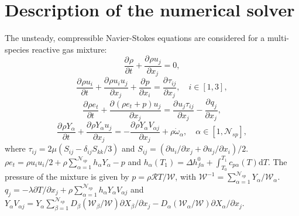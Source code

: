 \documentclass[conf]{new-aiaa}
\newcommand*{\pd}[3][]{\frac{\partial^{#1}#2}{\partial{#3}^{#1}}} %
\newcommand{\addim}[1]{{#1}} %
\newcommand{\Wcal}{\mathcal{W}}
\newcommand{\Rcal}{\mathcal{R}}
\newcommand{\nspc}{\mathcal{N}_{sp}}
\begin{document}
\section{Description of the numerical solver}
The unsteady, compressible Navier-Stokes equations are considered for a multi-species reactive gas mixture:
\begin{equation}\label{eq:eqs_originelles_ch_i}
\pd{\addim{\rho}}{\addim{t}}+
\pd{\addim{\rho} \addim{u}_j}{\addim{x}_j}=0 ,
\end{equation}
\begin{equation}
\pd{\addim{\rho} \addim{u}_i}{\addim{t}}+
\pd{\addim{\rho} \addim{u}_i \addim{u}_j}{\addim{x}_j}
+\pd{\addim{p}}{\addim{x}_i}=\pd{\addim{\tau}_{ij}}{\addim{x}_j} , \quad
i \in \left[ 1,3 \right] ,
\end{equation}
\begin{equation}
\pd{\addim{\rho} \addim{e}_t}{\addim{t}}+
\pd{\left(\addim{\rho} \addim{e}_t + \addim{p} \right)\addim{u}_j}
{\addim{x}_j}=
\pd{\addim{u}_j\addim{\tau}_{ij}}{\addim{x}_j}
-\pd{\addim{q}_j}{\addim{x}_j} , \label{eq:energie_ch}
\end{equation}
\begin{equation}
\pd{\addim{\rho}Y_\alpha}{\addim{t}}+
\pd{\addim{\rho} Y_\alpha \addim{u}_j}{\addim{x}_j}=
-\pd{\addim{\rho} Y_\alpha \addim{V}_{\alpha j}}{\addim{x}_j} +
\addim{\rho} \addim{\dot{\omega}}_\alpha , \quad
\alpha \in \left[ 1,\nspc \right] ,
\label{eq:eqs_originelles_ch_f}
\end{equation}
where $\addim{\tau}_{ij}=2\addim{\mu}\left(\addim{S}_{ij} - \delta_{ij} \addim{S}_{kk} / 3 \right)$ and $\addim{S}_{ij}=\left(\partial{\addim{u}_i}/\partial{\addim{x}_j}+
\partial{\addim{u}_j}/\partial{\addim{x}_i}\right)/2$. $\addim{\rho}\addim{e}_t=\addim{\rho}{\addim{u}_i\addim{u}_i}/{2}+ \addim{\rho}\sum^{\nspc}_{\alpha=1} \addim{h}_\alpha Y_\alpha - \addim{p}$ and $\addim{h}_\alpha \left(\addim{T}_1\right) =  \Delta {\addim{h}}^0_{f\alpha} + \int^{\addim{T}_1}_{\addim{T}_0}  \addim{c}_{p\alpha} \left(\addim{T}\right) \mathrm{d} \addim{T}$. The pressure of the mixture is given by $\addim{p}=\addim{\rho}{\Rcal}\addim{T}/{\Wcal}$, with $\Wcal^{-1}=\sum^{\nspc}_{\alpha=1} {Y_\alpha}/{\Wcal_\alpha}$. $\addim{q}_j=-\addim{\lambda} \partial{\addim{T}}/\partial{\addim{x}_j} + \addim{\rho} \sum^{\nspc}_{\alpha=1}  \addim{h}_\alpha Y_\alpha \addim{V}_{\alpha j} $ and $Y_{\alpha}\addim{V}_{\alpha j} = Y_{\alpha}   \sum^{\nspc}_{\beta=1} \addim{D}_{\beta} ({\Wcal_{\beta}}/{\Wcal}) \partial{X_{\beta}}/\partial{\addim{x}_j} - \addim{D}_{\alpha} ({\Wcal_{\alpha}}/{\Wcal}) \partial{X_{\alpha}}/\partial{\addim{x}_j} $.
\end{document}
